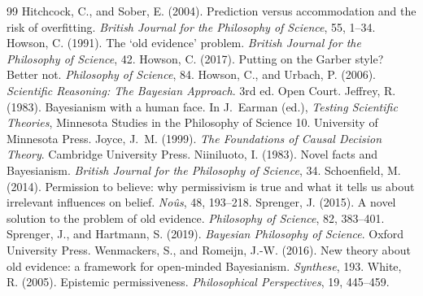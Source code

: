 \documentclass{situationist-preprint}
\begin{document}
\begin{thebibliography}{99}
 Hitchcock, C., and Sober, E. (2004). Prediction versus accommodation and the risk of overfitting. \emph{British Journal for the Philosophy of Science}, 55, 1--34.
 Howson, C. (1991). The `old evidence' problem. \emph{British Journal for the Philosophy of Science}, 42.
 Howson, C. (2017). Putting on the Garber style? Better not. \emph{Philosophy of Science}, 84.
 Howson, C., and Urbach, P. (2006). \emph{Scientific Reasoning: The Bayesian Approach}. 3rd ed. Open Court.
 Jeffrey, R. (1983). Bayesianism with a human face. In J.~Earman (ed.), \emph{Testing Scientific Theories}, Minnesota Studies in the Philosophy of Science 10. University of Minnesota Press.
 Joyce, J.~M. (1999). \emph{The Foundations of Causal Decision Theory}. Cambridge University Press.
 Niiniluoto, I. (1983). Novel facts and Bayesianism. \emph{British Journal for the Philosophy of Science}, 34.
 Schoenfield, M. (2014). Permission to believe: why permissivism is true and what it tells us about irrelevant influences on belief. \emph{No\^us}, 48, 193--218.
 Sprenger, J. (2015). A novel solution to the problem of old evidence. \emph{Philosophy of Science}, 82, 383--401.
 Sprenger, J., and Hartmann, S. (2019). \emph{Bayesian Philosophy of Science}. Oxford University Press.
 Wenmackers, S., and Romeijn, J.-W. (2016). New theory about old evidence: a framework for open-minded Bayesianism. \emph{Synthese}, 193.
 White, R. (2005). Epistemic permissiveness. \emph{Philosophical Perspectives}, 19, 445--459.
\end{thebibliography}
\end{document}
